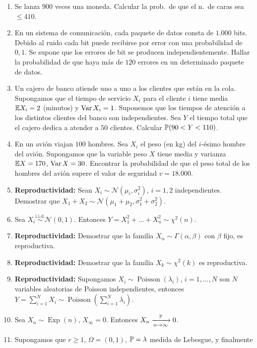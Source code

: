 \begin{enumerate}
  \item Se lanza $900$ veces una moneda. Calcular la prob.\ de que el n.\ de caras sea $\le 410$.
  \item En un sistema de comunicación, cada paquete de datos consta de $1.000$ bits. Debido al ruido cada bit puede recibirse por error con una probabilidad de $0,1$. Se supone que los errores de bit se producen independientemente. Hallar la probabilidad de que haya más de $120$ errores en un determinado paquete de datos.
  \item Un cajero de banco atiende uno a uno a los clientes que están en la cola. Supongamos que el tiempo de servicio $X_i$ para el cliente $i$ tiene media $\mathbb{E} X_i = 2$ (minutos) y $\operatorname{Var} X_i = 1$. Suponemos que los tiempos de atención a los distintos clientes del banco son independientes. Sea $Y$ el tiempo total que el cajero dedica a atender a $50$ clientes. Calcular $\mathbb{P}(90 < Y < 110)$.
  \item En un avión viajan $100$ hombres. Sea $X_i$ el peso (en kg) del $i$-ésimo hombre del avión. Supongamos que la variable peso $X$ tiene media y varianza $\mathbb{E} X = 170$, $\operatorname{Var} X = 30$. Encontrar la probabilidad de que el peso total de los hombres del avión supere el valor de seguridad $v = 18.000$.
  \item \textbf{Reproductividad:} Sean $X_i \sim \mathcal{N}(\mu_i, \sigma_i^2)$, $i=1,2$ independientes. Demostrar que $X_1 + X_2 \sim \mathcal{N}(\mu_1 + \mu_2, \sigma_1^2 + \sigma_2^2)$.
  \item Sea $X_i \stackrel{\text{i.i.d.}}{\sim} \mathcal{N}(0,1)$. Entonces $Y = X_1^2 + \dots + X_n^2 \sim \chi^2(n)$.
  \item \textbf{Reproductividad:} Demostrar que la familia $X_\alpha \sim \Gamma(\alpha, \beta)$ con $\beta$ fijo, es reproductiva.
  \item \textbf{Reproductividad:} Demostrar que la familia $X_k \sim \chi^2(k)$ es reproductiva.
  \item \textbf{Reproductividad:} Supongamos $X_i \sim \operatorname{Poisson}(\lambda_i)$, $i=1,\dots,N$ son $N$ variables aleatorias de Poisson independientes, entonces $Y = \sum_{i=1}^N X_i \sim \operatorname{Poisson}\!\left(\sum_{i=1}^N \lambda_i\right)$.
  \item Sea $X_n \sim \operatorname{Exp}(n)$, $X_\infty = 0$. Entonces $X_n \xrightarrow[n\to\infty]{\mathbb{P}} 0$.
  \item Supongamos que $r \ge 1$, $\Omega = (0,1)$, $\mathbb{P} = \lambda$ medida de Lebesgue, y finalmente

\end{enumerate}
